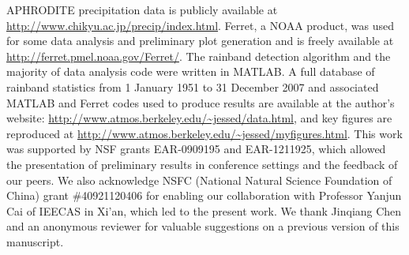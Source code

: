 \documentclass{ametsoc}
\begin{document}
%
\acknowledgments
APHRODITE precipitation data is publicly available at \url{http://www.chikyu.ac.jp/precip/index.html}. Ferret, a NOAA product, was used for some data analysis and preliminary plot generation and is freely available at \url{http://ferret.pmel.noaa.gov/Ferret/}. The rainband detection algorithm and the majority of data analysis code were written in MATLAB. A full database of rainband statistics from 1 January 1951 to 31 December 2007 and associated MATLAB and Ferret codes used to produce results are available at the author's website: \url{http://www.atmos.berkeley.edu/~jessed/data.html}, and key figures are reproduced at \url{http://www.atmos.berkeley.edu/~jessed/myfigures.html}. This work was supported by NSF grants EAR-0909195 and EAR-1211925, which allowed the presentation of preliminary results in conference settings and the feedback of our peers. We also acknowledge NSFC (National Natural Science Foundation of China) grant \#40921120406 for enabling our collaboration with Professor Yanjun Cai of IEECAS in Xi'an, which led to the present work. We thank Jinqiang Chen and an anonymous reviewer for valuable suggestions on a previous version of this manuscript.

%




\end{document}
